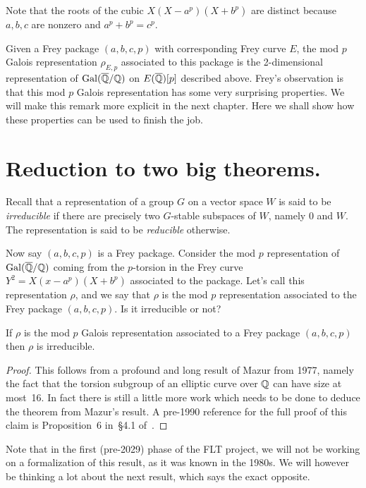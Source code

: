 Note that the roots of the cubic $X(X-a^p)(X+b^p)$ are distinct because $a,b,c$ are nonzero and
$a^p+b^p=c^p$.

Given a Frey package $(a,b,c,p)$ with corresponding Frey curve $E$, the mod $p$ Galois
representation $\rho_{E,p}$ associated to this package is the 2-dimensional representation of
$\operatorname{Gal}(\overline{\mathbb{Q}}/\mathbb{Q})$ on $E(\overline{\mathbb{Q}})[p]$ described above. Frey's observation is that this mod $p$ Galois
representation has some very surprising properties. We will make this remark more explicit
in the next chapter. Here we shall show how these properties can be used to finish the job.

\section{Reduction to two big theorems.}

Recall that a representation of a group $G$ on a vector space $W$ is said to be \emph{irreducible}
if there are precisely two $G$-stable subspaces of $W$, namely $0$ and $W$.
The representation is said to be \emph{reducible} otherwise.

Now say $(a,b,c,p)$ is a Frey package.
Consider the mod $p$ representation of $\operatorname{Gal}(\overline{\mathbb{Q}}/\mathbb{Q})$ coming from the $p$-torsion in the Frey
curve $Y^2=X(x-a^p)(X+b^p)$ associated to the package. Let's call this representation $\rho$,
and we say that $\rho$ is the mod $p$ representation associated to the Frey package $(a,b,c,p)$.
Is it irreducible or not?

\begin{theorem}[Mazur]
  \label{Mazur_Frey}
  \leanok
  If $\rho$ is the mod $p$ Galois representation associated to a Frey package $(a,b,c,p)$ then
  $\rho$ is irreducible.
\end{theorem}
\begin{proof}
  \notready
  This follows from a profound and long result of Mazur \cite{mazur-torsion} from 1977,
  namely the fact that the torsion subgroup of an elliptic curve over $\mathbb{Q}$ can have size at most~16.
  In fact there is still a little more work which needs to be done to deduce the theorem from
  Mazur's result. A pre-1990 reference for the full proof of this claim is Proposition~6
  in~\S4.1 of~\cite{serreconj}.
\end{proof}

Note that in the first (pre-2029) phase of the FLT project, we will not be working on
a formalization of this result, as it was known in the 1980s. We will however be thinking
a lot about the next result, which says the exact opposite.

